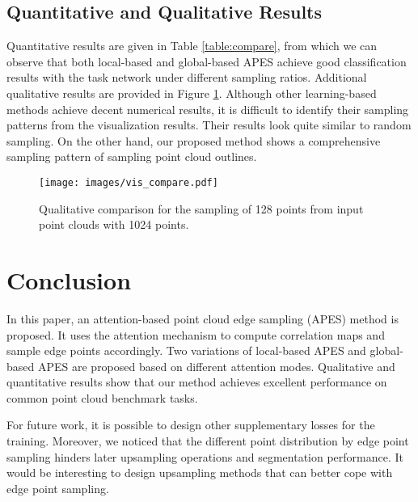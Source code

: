 \documentclass[10pt,twocolumn,letterpaper]{article}
\begin{document}
\subsection{Quantitative and Qualitative Results}
Quantitative results are given in Table \ref{table:compare}, from which we can observe that both local-based and global-based APES achieve good classification results with the task network under different sampling ratios. Additional qualitative results are provided in Figure \ref{fig:vis_compare}. 
Although other learning-based methods achieve decent numerical results, it is difficult to identify their sampling patterns from the visualization results.
Their results look quite similar to random sampling. On the other hand, our proposed method shows a comprehensive sampling pattern of sampling point cloud outlines. 

\begin{figure}[t]
    \centering
    \setlength{\abovecaptionskip}{0.2cm}
    \texttt{[image: images/vis\_compare.pdf]}
    \caption{Qualitative comparison for the sampling of 128 points from input point clouds with 1024 points. 
    \vspace{-0.2cm}
    }
    \label{fig:vis_compare}
\end{figure}


\section{Conclusion}
\label{sec:conclusion}
In this paper, an attention-based point cloud edge sampling (APES) method is proposed. 
It uses the attention mechanism to compute correlation maps and sample edge points accordingly. Two variations of local-based APES and global-based APES are proposed based on different attention modes. Qualitative and quantitative results show that our method achieves excellent performance on common point cloud benchmark tasks.

For future work, it is possible to design other supplementary losses for the training. Moreover, we noticed that the different point distribution by edge point sampling hinders later upsampling operations and segmentation performance. It would be interesting to design upsampling methods that can better cope with edge point sampling.

{\small


}
\end{document}
